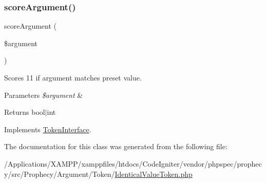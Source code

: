 \subsubsection{\texorpdfstring{score\+Argument()}{scoreArgument()}}
{\footnotesize\ttfamily score\+Argument (\begin{DoxyParamCaption}\item[{}]{\$argument }\end{DoxyParamCaption})}

Scores 11 if argument matches preset value.


\begin{DoxyParams}{Parameters}
{\em \$argument} & \\
\hline
\end{DoxyParams}
\begin{DoxyReturn}{Returns}
bool$\vert$int 
\end{DoxyReturn}


Implements \mbox{\hyperlink{interface_prophecy_1_1_argument_1_1_token_1_1_token_interface_a8d5bf47ab6eaa935458d5ad160e52822}{Token\+Interface}}.



The documentation for this class was generated from the following file\+:\begin{DoxyCompactItemize}
\item 
/\+Applications/\+X\+A\+M\+P\+P/xamppfiles/htdocs/\+Code\+Igniter/vendor/phpspec/prophecy/src/\+Prophecy/\+Argument/\+Token/\mbox{\hyperlink{_identical_value_token_8php}{Identical\+Value\+Token.\+php}}\end{DoxyCompactItemize}

